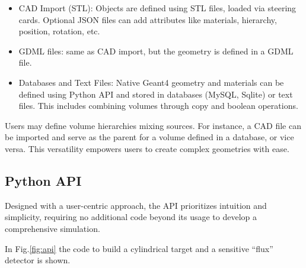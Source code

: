 \begin{itemize}
    \item CAD Import (STL): Objects are defined using STL files, loaded via
    steering cards.
    Optional JSON files can add attributes like materials,
    hierarchy, position, rotation, etc.
    \item GDML files: same as CAD import, but the geometry is defined
    in a GDML file.
    \item Databases and Text Files: Native Geant4 geometry and materials can be defined
    using Python API and stored in databases (MySQL, Sqlite) or text files.
    This includes combining volumes through copy and boolean operations.
\end{itemize}
Users may define volume hierarchies mixing sources.
For instance, a CAD file can be imported and serve as the parent for a volume
defined in a database, or vice versa.
This versatility empowers users to create complex geometries with ease.

\subsection{Python API}
\label{subsec:api}
Designed with a user-centric approach, the API prioritizes intuition and simplicity,
requiring no additional code beyond its usage to develop a comprehensive simulation.

In Fig.\ref{fig:api} the code to build a cylindrical target and
a sensitive ``flux'' detector is shown.

